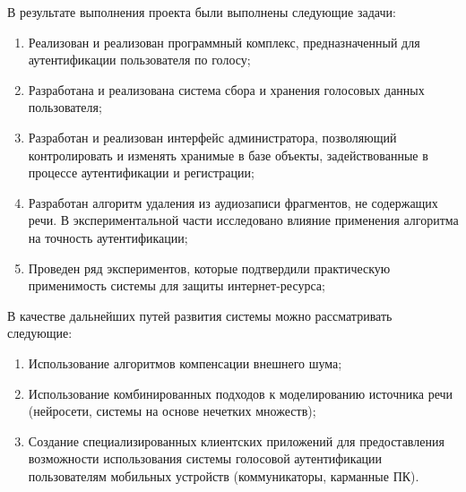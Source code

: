 \Outtro

В результате выполнения проекта были выполнены следующие задачи:

\begin{enumerate}
\item Реализован и реализован программный комплекс, предназначенный для аутентификации
пользователя по голосу;
\item Разработана и реализована система сбора и хранения голосовых данных
пользователя;
\item Разработан и реализован интерфейс администратора, позволяющий
контролировать и изменять хранимые в базе объекты, задействованные в процессе
аутентификации и регистрации;
\item Разработан алгоритм удаления из аудиозаписи фрагментов, не содержащих
речи. В экспериментальной части исследовано влияние применения алгоритма на
точность аутентификации;
\item Проведен ряд экспериментов, которые 
подтвердили практическую применимость системы для защиты интернет-ресурса;
\end{enumerate}

В качестве дальнейших путей развития системы можно рассматривать следующие:

\begin{enumerate}
\item Использование алгоритмов компенсации внешнего шума;
\item Использование комбинированных подходов к моделированию источника речи
(нейросети, системы на основе нечетких множеств);
\item Создание специализированных клиентских приложений для предоставления
возможности использования системы
голосовой аутентификации пользователям мобильных устройств (коммуникаторы,
карманные ПК).
\end{enumerate}

